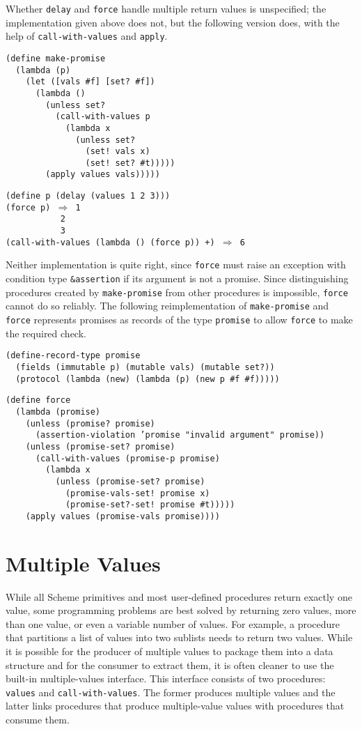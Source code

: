 Whether \texttt{delay} and \texttt{force} handle multiple return values
is unspecified; the implementation given above does not, but the following
version does, with the help of \texttt{call-with-values} and \texttt{apply}.


\begin{alltt}
(define make-promise
  (lambda (p)
    (let ([vals \#{}f] [set? \#{}f])
      (lambda ()
        (unless set?
          (call-with-values p
            (lambda x
              (unless set?
                (set! vals x)
                (set! set? \#{}t)))))
        (apply values vals)))))

(define p (delay (values 1 2 3)))
(force p) \(\Rightarrow\) 1
           2
           3
(call-with-values (lambda () (force p)) +) \(\Rightarrow\) 6
\end{alltt}


Neither implementation is quite right, since \texttt{force} must raise
an exception with condition type \texttt{\&{}assertion} if its argument is
not a promise.
Since distinguishing procedures created by \texttt{make-promise} from
other procedures is impossible, \texttt{force} cannot do so reliably.
The following reimplementation of \texttt{make-promise} and \texttt{force}
represents promises as records of the type \texttt{promise} to allow
\texttt{force} to make the required check.


\begin{alltt}
(define-record-type promise
  (fields (immutable p) (mutable vals) (mutable set?))
  (protocol (lambda (new) (lambda (p) (new p \#{}f \#{}f)))))

(define force
  (lambda (promise)
    (unless (promise? promise)
      (assertion-violation 'promise "invalid argument" promise))
    (unless (promise-set? promise)
      (call-with-values (promise-p promise)
        (lambda x
          (unless (promise-set? promise)
            (promise-vals-set! promise x)
            (promise-set?-set! promise \#{}t)))))
    (apply values (promise-vals promise))))
\end{alltt}

\section{\label{control_g104}\label{control_h8}Multiple Values\label{control_SECTMRVS}}



While all Scheme primitives and most user-defined procedures return
exactly one value, some programming problems are best solved by
returning zero values, more than one value, or even a variable number of
values.
For example, a procedure that partitions a list of values into two
sublists needs to return two values.
While it is possible for the producer of multiple values to package
them into a data structure and for the consumer to extract them,
it is often cleaner to use the built-in multiple-values interface.
This interface consists of two procedures:
\label{control_s68}\texttt{values}
and
\label{control_s69}\texttt{call-with-values}.
The former produces multiple values and the latter 
links procedures that produce multiple-value values with
procedures that consume them.


